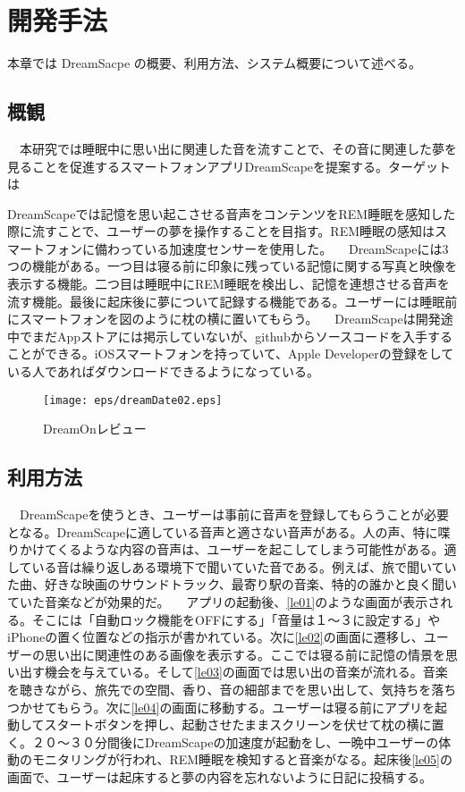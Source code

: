 \chapter{開発手法}
\label{chap:coding}

本章では DreamSacpe の概要、利用方法、システム概要について述べる。

\section{概観}
　本研究では睡眠中に思い出に関連した音を流すことで、その音に関連した夢を見ることを促進するスマートフォンアプリDreamScapeを提案する。ターゲットは

DreamScapeでは記憶を思い起こさせる音声をコンテンツをREM睡眠を感知した際に流すことで、ユーザーの夢を操作することを目指す。REM睡眠の感知はスマートフォンに備わっている加速度センサーを使用した。
　DreamScapeには3つの機能がある。一つ目は寝る前に印象に残っている記憶に関する写真と映像を表示する機能。二つ目は睡眠中にREM睡眠を検出し、記憶を連想させる音声を流す機能。最後に起床後に夢について記録する機能である。ユーザーには睡眠前にスマートフォンを図のように枕の横に置いてもらう。
　DreamScapeは開発途中でまだAppストアには掲示していないが、githubからソースコードを入手することができる。iOSスマートフォンを持っていて、Apple Developerの登録をしている人であればダウンロードできるようになっている。
\begin{figure}[htbp]
\begin{center}
\texttt{[image: eps/dreamDate02.eps]}
\caption{DreamOnレビュー}
\label{DreamOnレビュー}
\end{center}
\end{figure}

\section{利用方法}
　DreamScapeを使うとき、ユーザーは事前に音声を登録してもらうことが必要となる。DreamScapeに適している音声と適さない音声がある。人の声、特に喋りかけてくるような内容の音声は、ユーザーを起こしてしまう可能性がある。適している音は繰り返しある環境下で聞いていた音である。例えば、旅で聞いていた曲、好きな映画のサウンドトラック、最寄り駅の音楽、特的の誰かと良く聞いていた音楽などが効果的だ。
　アプリの起動後、\ref{le01}のような画面が表示される。そこには「自動ロック機能をOFFにする」「音量は１〜３に設定する」やiPhoneの置く位置などの指示が書かれている。次に\ref{le02}の画面に遷移し、ユーザーの思い出に関連性のある画像を表示する。ここでは寝る前に記憶の情景を思い出す機会を与えている。そして\ref{le03}の画面では思い出の音楽が流れる。音楽を聴きながら、旅先での空間、香り、音の細部までを思い出して、気持ちを落ちつかせてもらう。次に\ref{le04}の画面に移動する。ユーザーは寝る前にアプリを起動してスタートボタンを押し、起動させたままスクリーンを伏せて枕の横に置く。２０〜３０分間後にDreamScapeの加速度が起動をし、一晩中ユーザーの体動のモニタリングが行われ、REM睡眠を検知すると音楽がなる。起床後\ref{le05}の画面で、ユーザーは起床すると夢の内容を忘れないように日記に投稿する。

